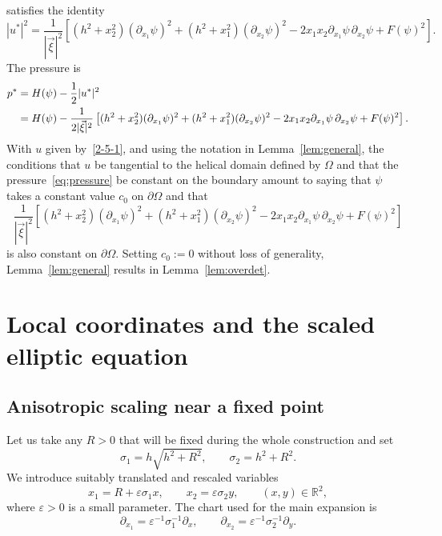 \documentclass[12pt,reqno]{amsart}
\numberwithin{equation}{section}
\theoremstyle{definition}
\theoremstyle{remark}
\begin{document}
  satisfies the identity
\begin{equation}\label{eq:kinetic}
|u^*|^2=\frac1{|\vec{\xi}|^2}
\left[(h^2+x_2^2)(\partial_{x_1}\psi)^2+(h^2+x_1^2)(\partial_{x_2}\psi)^2
-2x_1x_2\partial_{x_1}\psi\,\partial_{x_2}\psi+F(\psi)^2\right].
\end{equation}
 The pressure is
\begin{align*} 
p^*&=H(\psi)-\frac12|u^*|^2 \notag\\
&=H(\psi)-\frac1{2|\vec{\xi}|^2}
\left[(h^2+x_2^2)(\partial_{x_1}\psi)^2+(h^2+x_1^2)(\partial_{x_2}\psi)^2
-2x_1x_2\partial_{x_1}\psi\,\partial_{x_2}\psi+F(\psi)^2\right].
\end{align*}
With $u$ given by~\eqref{2-5-1}, and using the notation in Lemma~\ref{lem:general}, the conditions that $u$ be tangential to the helical domain defined by $\varOmega$ and that the pressure~\eqref{eq:pressure} be constant on the boundary amount to saying that $\psi$ takes a constant value $c_0$ on $\partial\varOmega$ and that $$ \frac1{|\vec{\xi}|^2}
\left[(h^2+x_2^2)(\partial_{x_1}\psi)^2+(h^2+x_1^2)(\partial_{x_2}\psi)^2
-2x_1x_2\partial_{x_1}\psi\,\partial_{x_2}\psi+F(\psi)^2\right] $$ is also constant on $\partial\varOmega$.
Setting $c_0:=0$ without loss of generality, Lemma~\ref{lem:general} results in Lemma~\ref{lem:overdet}.



\section{Local coordinates and the scaled elliptic equation}\label{sec:Dirichlet}

\subsection{Anisotropic scaling near a fixed point}

Let us take any $R>0$  that will be fixed during the whole construction and set
\begin{equation*}%
\sigma_1=h\sqrt{h^2+R^2},\qquad \sigma_2=h^2+R^2.
\end{equation*}
We introduce suitably translated and rescaled variables 
\begin{equation*}%
x_1=R+\varepsilon\sigma_1 x,
\qquad x_2=\varepsilon\sigma_2 y,
\qquad (x,y)\in\mathbb{R}^2,
\end{equation*}
where $\varepsilon>0$ is a small parameter.  The chart used for the main expansion is
\begin{equation}\label{eq:chart}
\partial_{x_1}=\varepsilon^{-1}\sigma_1^{-1}\partial_x,
\qquad \partial_{x_2}=\varepsilon^{-1}\sigma_2^{-1}\partial_y.
\end{equation}
\end{document}
